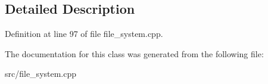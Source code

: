 \subsection{Detailed Description}


Definition at line 97 of file file\+\_\+system.\+cpp.



The documentation for this class was generated from the following file\+:\begin{DoxyCompactItemize}
\item 
src/file\+\_\+system.\+cpp\end{DoxyCompactItemize}
